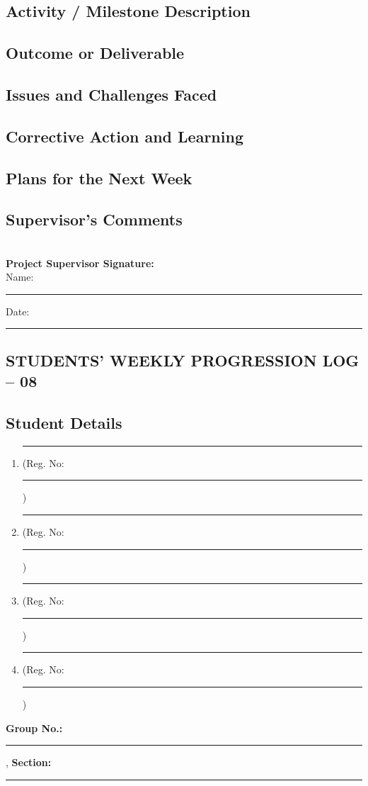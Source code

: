 \documentclass[a4paper]{article}
\begin{document}
\subsection*{Activity / Milestone Description}
\framebox[\textwidth][c]{\rule{0pt}{4cm}}

\subsection*{Outcome or Deliverable}
\framebox[\textwidth][c]{\rule{0pt}{4cm}}


\subsection*{Issues and Challenges Faced}
\framebox[\textwidth][c]{\rule{0pt}{4cm}}


\subsection*{Corrective Action and Learning}
\framebox[\textwidth][c]{\rule{0pt}{4cm}}


\subsection*{Plans for the Next Week}
\framebox[\textwidth][c]{\rule{0pt}{4cm}}

\subsection*{Supervisor's Comments}
\framebox[\textwidth][c]{\rule{0pt}{4cm}}\\[2em]

\vfill
\textbf{Project Supervisor Signature:}\\[1em]
Name: \rule{6cm}{0.4pt} \hfill Date: \rule{4cm}{0.4pt}

\newpage
\begin{center}
\section*{STUDENTS' WEEKLY PROGRESSION LOG -- 08}
\end{center}

\subsection*{Student Details}
\begin{enumerate}[itemsep=0em]
\item \rule{8cm}{0.4pt} (Reg. No:\rule{2cm}{0.4pt})
\item \rule{8cm}{0.4pt} (Reg. No:\rule{2cm}{0.4pt})
\item \rule{8cm}{0.4pt} (Reg. No:\rule{2cm}{0.4pt})
\item \rule{8cm}{0.4pt} (Reg. No:\rule{2cm}{0.4pt})
\end{enumerate}
\textbf{Group No.:} \rule{4cm}{0.4pt}, \textbf{Section:} \rule{3.5cm}{0.4pt}
\end{document}
